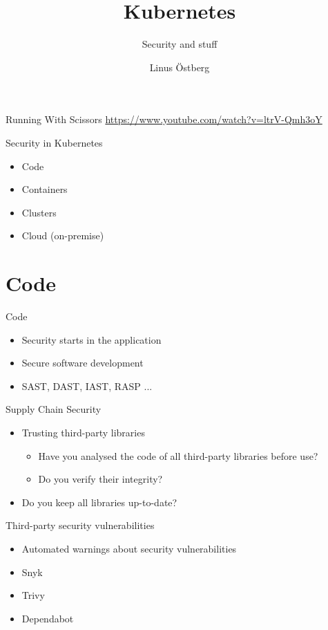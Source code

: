 \documentclass{dcpresentation}
\title{Kubernetes}
\subtitle{Security and stuff}
\author{Linus Östberg}
\institute{SciLifeLab Data Centre}
\date{}
\begin{document}
\begin{frame}
  \maketitle
\end{frame}

\begin{frame}{Running With Scissors}
  \url{https://www.youtube.com/watch?v=ltrV-Qmh3oY}
\end{frame}


\begin{frame}{Security in Kubernetes}
  \begin{itemize}
  \item Code
  \item Containers
  \item Clusters
  \item Cloud (on-premise)
  \end{itemize}
\end{frame}

\section{Code}

\begin{frame}{Code}
  \begin{itemize}
  \item Security starts in the application
  \item Secure software development
  \item SAST, DAST, IAST, RASP ...
  \end{itemize}
\end{frame}

\begin{frame}{Supply Chain Security}
  \begin{itemize}
  \item Trusting third-party libraries
    \begin{itemize}
    \item Have you analysed the code of all third-party libraries before use?
    \item Do you verify their integrity?
    \end{itemize}
  \item Do you keep all libraries up-to-date?
  \end{itemize}
\end{frame}

\begin{frame}{Third-party security vulnerabilities}
  \begin{itemize}
  \item Automated warnings about security vulnerabilities
  \item Snyk
  \item Trivy
  \item Dependabot
  \end{itemize}
\end{frame}
\end{document}
